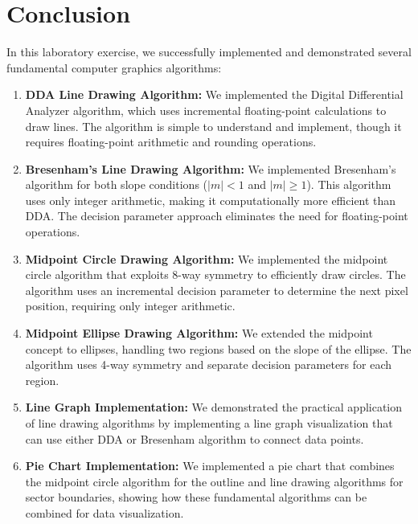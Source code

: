 \documentclass[12pt,a4paper]{article}
\begin{document}
\newpage
\section{Conclusion}

In this laboratory exercise, we successfully implemented and demonstrated several fundamental computer graphics algorithms:

\begin{enumerate}
    \item \textbf{DDA Line Drawing Algorithm:} We implemented the Digital Differential Analyzer algorithm, which uses incremental floating-point calculations to draw lines. The algorithm is simple to understand and implement, though it requires floating-point arithmetic and rounding operations.
    
    \item \textbf{Bresenham's Line Drawing Algorithm:} We implemented Bresenham's algorithm for both slope conditions ($|m| < 1$ and $|m| \geq 1$). This algorithm uses only integer arithmetic, making it computationally more efficient than DDA. The decision parameter approach eliminates the need for floating-point operations.
    
    \item \textbf{Midpoint Circle Drawing Algorithm:} We implemented the midpoint circle algorithm that exploits 8-way symmetry to efficiently draw circles. The algorithm uses an incremental decision parameter to determine the next pixel position, requiring only integer arithmetic.
    
    \item \textbf{Midpoint Ellipse Drawing Algorithm:} We extended the midpoint concept to ellipses, handling two regions based on the slope of the ellipse. The algorithm uses 4-way symmetry and separate decision parameters for each region.
    
    \item \textbf{Line Graph Implementation:} We demonstrated the practical application of line drawing algorithms by implementing a line graph visualization that can use either DDA or Bresenham algorithm to connect data points.
    
    \item \textbf{Pie Chart Implementation:} We implemented a pie chart that combines the midpoint circle algorithm for the outline and line drawing algorithms for sector boundaries, showing how these fundamental algorithms can be combined for data visualization.
\end{enumerate}
\end{document}
